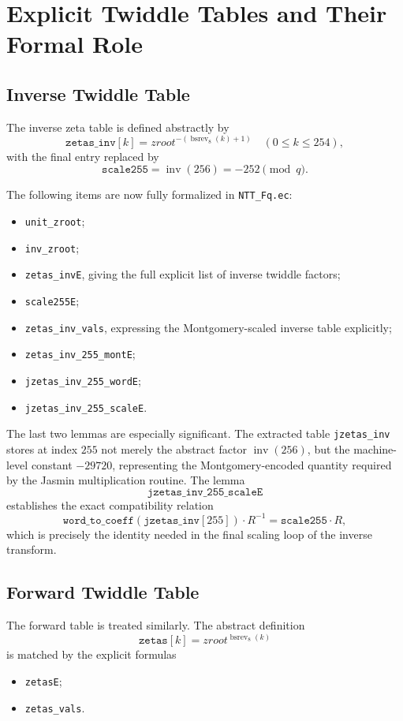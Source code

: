 \documentclass[11pt]{article}
\begin{document}
\section{Explicit Twiddle Tables and Their Formal Role}

\subsection{Inverse Twiddle Table}

The inverse zeta table is defined abstractly by
\[
\texttt{zetas\_inv}[k] = zroot^{-(\operatorname{bsrev}_8(k)+1)}
\quad (0 \le k \le 254),
\]
with the final entry replaced by
\[
\texttt{scale255} = \operatorname{inv}(256) = -252 \pmod q.
\]

The following items are now fully formalized in \texttt{NTT\_Fq.ec}:
\begin{itemize}
\item \texttt{unit\_zroot};
\item \texttt{inv\_zroot};
\item \texttt{zetas\_invE}, giving the full explicit list of inverse twiddle factors;
\item \texttt{scale255E};
\item \texttt{zetas\_inv\_vals}, expressing the Montgomery-scaled inverse table explicitly;
\item \texttt{zetas\_inv\_255\_montE};
\item \texttt{jzetas\_inv\_255\_wordE};
\item \texttt{jzetas\_inv\_255\_scaleE}.
\end{itemize}

The last two lemmas are especially significant. The extracted table
\texttt{jzetas\_inv} stores at index \(255\) not merely the abstract factor
\(\operatorname{inv}(256)\), but the machine-level constant
\(-29720\), representing the Montgomery-encoded quantity required by the
Jasmin multiplication routine. The lemma
\[
\texttt{jzetas\_inv\_255\_scaleE}
\]
establishes the exact compatibility relation
\[
\texttt{word\_to\_coeff}(\texttt{jzetas\_inv}[255]) \cdot R^{-1}
=
\texttt{scale255} \cdot R,
\]
which is precisely the identity needed in the final scaling loop of the
inverse transform.

\subsection{Forward Twiddle Table}

The forward table is treated similarly. The abstract definition
\[
\texttt{zetas}[k] = zroot^{\operatorname{bsrev}_8(k)}
\]
is matched by the explicit formulas
\begin{itemize}
\item \texttt{zetasE};
\item \texttt{zetas\_vals}.
\end{itemize}
\end{document}
